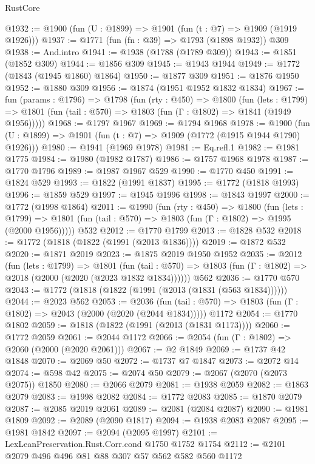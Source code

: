 \begin{lexlean}{RustCore}
\begin{coremodule}
@1932 := @1900 (fun (U : @1899) => @1901 (fun (t : @7) => @1909 (@1919 @1926)))
@1937 := @1771 (fun (fn : @39) => @1793 (@1898 @1932)) @309
@1938 := And.intro
@1941 := @1938 (@1788 (@1789 @309))
@1943 := @1851 (@1852 @309)
@1944 := @1856 @309
@1945 := @1943 @1944
@1949 := @1772 (@1843 (@1945 @1860) @1864)
@1950 := @1877 @309
@1951 := @1876 @1950
@1952 := @1880 @309
@1956 := @1874 (@1951 @1952 @1832 @1834)
@1967 := fun (params : @1796) =>
  @1798
    (fun (rty : @450) =>
    @1800
      (fun (lets : @1799) =>
      @1801 (fun (tail : @570) => @1803 (fun (Γ : @1802) => @1841 (@1949 @1956)))))
@1968 := @1797 @1967
@1969 := @1794 @1968
@1978 := @1900 (fun (U : @1899) => @1901 (fun (t : @7) => @1909 (@1772 (@1915 @1944 @1790) @1926)))
@1980 := @1941 (@1969 @1978)
@1981 := Eq.refl.{1}
@1982 := @1981 @1775
@1984 := @1980 (@1982 @1787)
@1986 := @1757 @1968 @1978
@1987 := @1770 @1796
@1989 := @1987 @1967 @529
@1990 := @1770 @450
@1991 := @1824 @529
@1993 := @1822 (@1991 @1837)
@1995 := @1772 (@1818 @1993)
@1996 := @1859 @529
@1997 := @1945 @1996
@1998 := @1843 @1997
@2000 := @1772 (@1998 @1864)
@2011 := @1990
    (fun (rty : @450) =>
    @1800
      (fun (lets : @1799) =>
      @1801 (fun (tail : @570) => @1803 (fun (Γ : @1802) => @1995 (@2000 @1956)))))
    @532
@2012 := @1770 @1799
@2013 := @1828 @532
@2018 := @1772 (@1818 (@1822 (@1991 (@2013 @1836))))
@2019 := @1872 @532
@2020 := @1871 @2019
@2023 := @1875 @2019 @1950 @1952
@2035 := @2012
    (fun (lets : @1799) =>
    @1801
      (fun (tail : @570) => @1803 (fun (Γ : @1802) => @2018 (@2000 (@2020 (@2023 @1832 @1834))))))
    @562
@2036 := @1770 @570
@2043 := @1772 (@1818 (@1822 (@1991 (@2013 (@1831 (@563 @1834))))))
@2044 := @2023 @562
@2053 := @2036
    (fun (tail : @570) => @1803 (fun (Γ : @1802) => @2043 (@2000 (@2020 (@2044 @1834)))))
    @1172
@2054 := @1770 @1802
@2059 := @1818 (@1822 (@1991 (@2013 (@1831 @1173))))
@2060 := @1772 @2059
@2061 := @2044 @1172
@2066 := @2054 (fun (Γ : @1802) => @2060 (@2000 (@2020 @2061)))
@2067 := @2 @1849
@2069 := @1737 @42 @1848
@2070 := @2069 @50
@2072 := @1737 @7 @1847
@2073 := @2072 @14
@2074 := @598 @42
@2075 := @2074 @50
@2079 := @2067 (@2070 (@2073 @2075)) @1850
@2080 := @2066 @2079
@2081 := @1938 @2059
@2082 := @1863 @2079
@2083 := @1998 @2082
@2084 := @1772 @2083
@2085 := @1870 @2079
@2087 := @2085 @2019 @2061
@2089 := @2081 (@2084 @2087)
@2090 := @1981 @1809
@2092 := @2089 (@2090 @1817)
@2094 := @1938 @2083 @2087
@2095 := @1981 @1842
@2097 := @2094 (@2095 @1997)
@2101 := LexLeanPreservation.Rust.Corr.cond @1750 @1752 @1754
@2112 := @2101 @2079 @496 @496 @81 @88 @307 @57 @562 @582 @560 @1172

\end{coremodule}
\end{lexlean}
